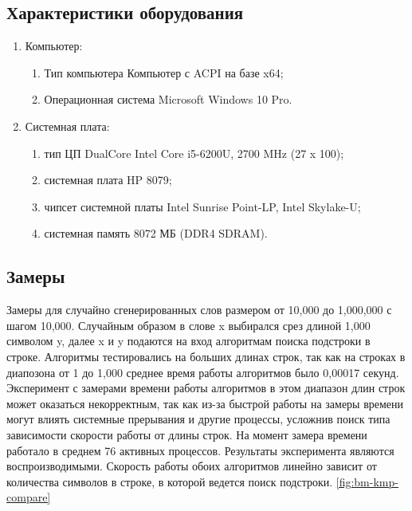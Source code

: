 \documentclass[../main.tex]{subfiles}
\begin{document}
	
\subsection{Характеристики оборудования}

	\begin{enumerate}[1)]
		\item Компьютер:
		\begin{enumerate}
			\item Тип компьютера   Компьютер с ACPI на базе x64;
			\item Операционная система   Microsoft Windows 10 Pro.
		\end{enumerate}
		\item Системная плата:
		\begin{enumerate}
			\item тип ЦП   DualCore Intel Core i5-6200U, 2700 MHz (27 x 100);
			\item системная плата   HP 8079;
			\item чипсет системной платы   Intel Sunrise Point-LP, Intel Skylake-U;
			\item системная память   8072 МБ (DDR4 SDRAM).
		\end{enumerate}
	\end{enumerate}

\subsection{Замеры}

	Замеры для случайно сгенерированных слов размером от 10,000 до 1,000,000 с шагом 10,000. Случайным образом в слове x выбирался срез длиной 1,000 символом y, далее x и y подаются на вход алгоритмам поиска подстроки в строке. 
	Алгоритмы тестировались на больших длинах строк, так как на строках в диапозона от 1 до 1,000 среднее время работы алгоритмов было 0,00017 секунд. 
	Эксперимент с замерами времени работы алгоритмов в этом диапазон длин строк может оказаться некорректным, так как из-за быстрой работы на замеры времени могут влиять системные прерывания и другие процессы, усложнив поиск типа зависимости скорости работы от длины строк. 
	На момент замера времени работало в среднем 76 активных процессов. Результаты эксперимента являются воспроизводимыми. 
	Скорость работы обоих алгоритмов линейно зависит от количества символов в строке, в которой ведется поиск подстроки. \ref{fig:bm-kmp-compare}
	
\end{document}
